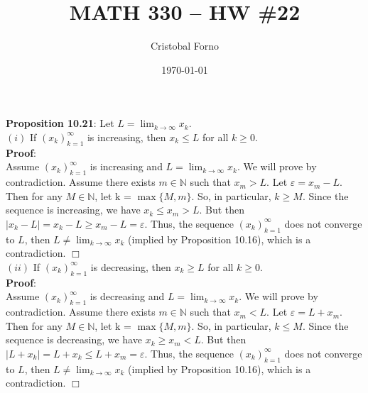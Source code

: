 \documentclass[12pt]{article}
\title{MATH 330 -- HW \#22}
\author{Cristobal Forno}
\date{\today}
\begin{document}
\maketitle

\textbf{Proposition 10.21}: Let $L = \lim_{k\to\infty} x_k.$\\
$(i)$ If $(x_k)_{k=1}^\infty$ is increasing, then $x_k \leq L$ for all $k \geq 0$.\\
\noindent
\textbf{Proof}:\\
\indent
Assume $(x_k)_{k=1}^\infty$ is increasing and $L = \lim_{k\to\infty} x_k$. We
will prove by contradiction. Assume there exists $m \in \mathbb{N}$ such that $x_m
> L$. Let $\varepsilon = x_m - L$. Then for any $M \in \mathbb{N}$, let k =
$\max\{M, m\}$. So, in particular, $k \geq M$. Since the sequence is increasing,
we have $x_k \leq x_m > L$. But then $|x_k - L| = x_k - L \geq x_m - L =
\varepsilon$. Thus, the sequence $(x_k)_{k=1}^\infty$ does not converge to $L$,
then $L \neq \lim_{k\to\infty} x_k$ (implied by Proposition 10.16), 
which is a contradiction. $\Box$ \\

\noindent
$(ii)$ If $(x_k)_{k=1}^\infty$ is decreasing, then $x_k \geq L$ for all $k \geq 0$.\\
\noindent
\textbf{Proof}:\\
\indent
Assume $(x_k)_{k=1}^\infty$ is decreasing and $L = \lim_{k\to\infty}x_k$. We
will prove by contradiction. Assume there exists $m \in \mathbb{N}$ such that
$x_m < L$. Let $\varepsilon = L + x_m$. Then for any $M \in \mathbb{N}$, let k =
$\max\{M, m\}$. So, in particular, $k \leq M$. Since the sequence is decreasing,
we have $x_k \geq x_m < L$. But then $|L+x_k| =  L+x_k \leq L+x_m=\varepsilon$.
Thus, the sequence $(x_k)_{k=1}^\infty$ does not converge to $L$, then $L \neq
\lim_{k\to\infty} x_k$ (implied by Proposition 10.16), which is a contradiction. $\Box$
\end{document}
